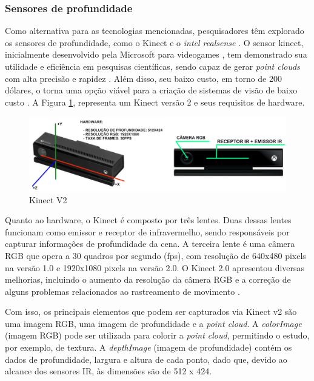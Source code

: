\subsubsection{Sensores de profundidade}
\label{subsec_Sensores de profundidade}

    Como alternativa para as tecnologias mencionadas, pesquisadores têm explorado os sensores de profundidade, como o Kinect e o \textit{intel realsense} \cite{ruchay_2018_fusion}. O sensor kinect, inicialmente desenvolvido pela Microsoft para videogames \cite{chan_2018_an}, tem demonstrado sua utilidade e eficiência em pesquisas científicas, sendo capaz de gerar \textit{point clouds} com alta precisão e rapidez \cite{chen_2013_research}. Além disso, seu baixo custo, em torno de 200 dólares, o torna uma opção viável para a criação de sistemas de visão de baixo custo \cite{wan_2012_a}. A Figura \ref{fig:Kinectv2}, representa um Kinect versão 2 e seus requisitos de hardware.
    
        \begin{figure}[h]
           \centering
           \includegraphics[width=1\textwidth]{imagens/KinectV2.png} 
           \caption{Kinect V2}
           \label{fig:Kinectv2}
        \end{figure}

    Quanto ao hardware, o Kinect é composto por três lentes. Duas dessas lentes funcionam como emissor e receptor de infravermelho, sendo responsáveis por capturar informações de profundidade da cena. A terceira lente é uma câmera RGB que opera a 30 quadros por segundo (fps), com resolução de 640x480 pixels na versão 1.0 e 1920x1080 pixels na versão 2.0. O Kinect 2.0 apresentou diversas melhorias, incluindo o aumento da resolução da câmera RGB e a correção de alguns problemas relacionados ao rastreamento de movimento \cite{chan_2018_an, ruchay_2018_fusion}.
    
    Com isso, os principais elementos que podem ser capturados via Kinect v2 são uma imagem RGB, uma imagem de profundidade e a \textit{point cloud}. A \textit{colorImage} (imagem RGB) pode ser utilizada para colorir a \textit{point cloud}, permitindo o estudo, por exemplo, de textura.  A \textit{depthImage} (imagem de profundidade) contém os dados de profundidade, largura e altura de cada ponto, dado que, devido ao alcance dos sensores IR, às dimensões são de 512 x 424.
        
